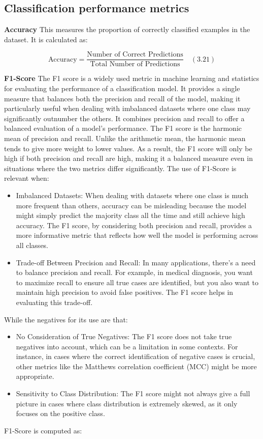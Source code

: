 \documentclass{Configuration_Files/PoliMi3i_thesis}
\begin{document}
\subsection{Classification performance metrics}

\textbf{Accuracy} \quad This measures the proportion of correctly classified examples in the dataset. It is calculated as:

\begin{equation}
\text{Accuracy} = \frac{\text{Number of Correct Predictions}}{\text{Total Number of Predictions}} \quad (3.21)
\end{equation}

\textbf{F1-Score} \quad The F1 score is a widely used metric in machine learning and statistics for evaluating the performance of a classification model. It provides a single measure that balances both the precision and recall of the model, making it particularly useful when dealing with imbalanced datasets where one class may significantly outnumber the others.
It combines precision and recall to offer a balanced evaluation of a model’s performance.
The F1 score is the harmonic mean of precision and recall. Unlike the arithmetic mean, the harmonic mean tends to give more weight to lower values. As a result, the F1 score will only be high if both precision and recall are high, making it a balanced measure even in situations where the two metrics differ significantly.
The use of F1-Score is relevant when:
\begin{itemize}
    \item Imbalanced Datasets: When dealing with datasets where one class is much more frequent than others, accuracy can be misleading because the model might simply predict the majority class all the time and still achieve high accuracy. The F1 score, by considering both precision and recall, provides a more informative metric that reflects how well the model is performing across all classes.
    \item Trade-off Between Precision and Recall: In many applications, there's a need to balance precision and recall. For example, in medical diagnosis, you want to maximize recall to ensure all true cases are identified, but you also want to maintain high precision to avoid false positives. The F1 score helps in evaluating this trade-off.
\end{itemize}
While the negatives for its use are that:
\begin{itemize}
    \item No Consideration of True Negatives: The F1 score does not take true negatives into account, which can be a limitation in some contexts. For instance, in cases where the correct identification of negative cases is crucial, other metrics like the Matthews correlation coefficient (MCC) might be more appropriate.
    \item Sensitivity to Class Distribution: The F1 score might not always give a full picture in cases where class distribution is extremely skewed, as it only focuses on the positive class.
\end{itemize}
F1-Score is computed as:
\end{document}

